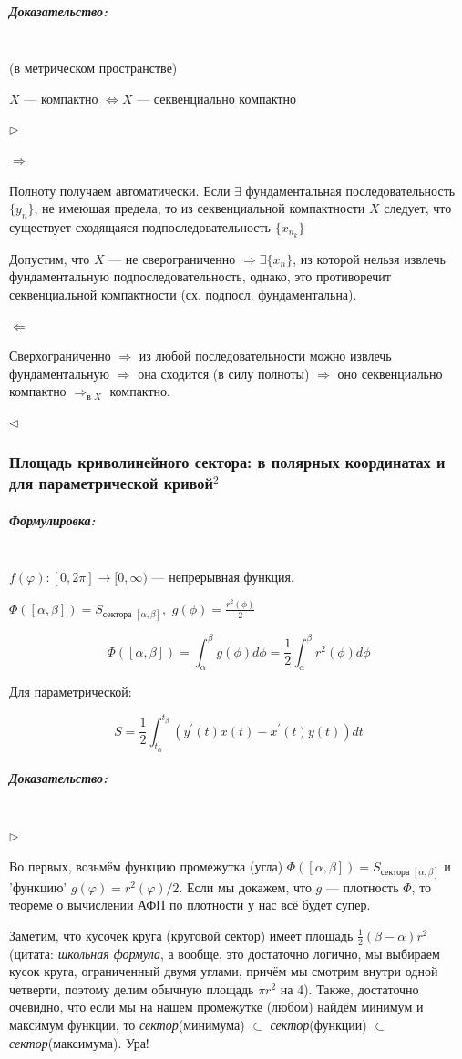 \documentclass{article}
\def\dbl{\,\,}
\let\vanillasubparagraph\subparagraph
\renewcommand{\subparagraph}[1]{\vanillasubparagraph{#1}\mbox{}\\}
\begin{document}
\subparagraph{Доказательство: }
(в метрическом пространстве)

$X$ --- компактно $\Leftrightarrow X$ --- секвенциально компактно

$\rhd$

$\Rightarrow$

Полноту получаем автоматически. Если $\exists$ фундаментальная последовательность $\{y_n\}$, не имеющая предела, то из секвенциальной компактности $X$ следует, что существует сходящаяся подпоследовательность $\{x_{n_k}\}$

Допустим, что $X$ --- не сверограниченно $\Rightarrow \exists \{x_n\}$, из которой нельзя извлечь фундаментальную подпоследовательность, однако, это противоречит секвенциальной компактности (сх. подпосл. фундаментальна).

$\Leftarrow$

Сверхограниченно $\Rightarrow$ из любой последовательности можно извлечь фундаментальную $\Rightarrow$ она сходится (в силу полноты) $\Rightarrow$ оно секвенциально компактно $\Rightarrow_{\text{в } X}$ компактно.

$\lhd$

\subsubsection{Площадь криволинейного сектора: в полярных координатах и для параметрической кривой\texorpdfstring{$^2$}{}}

\subparagraph{Формулировка:}

$f(\varphi): [0, 2\pi] \rightarrow [0, \infty)$ --- непрерывная функция.

$\Phi([\alpha, \beta]) = S_{\text{сектора } [\alpha, \beta]}, \dbl g(\phi) = \frac{r^2(\phi)}{2}$

\[\Phi([\alpha, \beta]) = \int_\alpha^\beta{g(\phi)d\phi} = \frac{1}{2}\int_\alpha^\beta{r^2(\phi)d\phi}\]

Для параметрической:

\[S =  \frac{1}{2}\int_{t_\alpha}^{t_\beta}{(y^\prime(t)x(t) - x^\prime(t)y(t))dt}\]

\subparagraph{Доказательство:}

$\rhd$

Во первых, возьмём функцию промежутка (угла) $\Phi([\alpha, \beta]) = S_{\text{сектора }[\alpha, \beta]}$ и 'функцию' $g(\varphi) = r^2(\varphi)/2$. Если мы докажем, что $g$ --- плотность $\Phi$, то теореме о вычислении АФП по плотности у нас всё будет супер.

Заметим, что кусочек круга (круговой сектор) имеет площадь $\frac{1}{2}(\beta - \alpha) r^2$ (цитата: \textit{школьная формула}, а вообще, это достаточно логично, мы выбираем кусок круга, ограниченный двумя углами, причём мы смотрим внутри одной четверти, поэтому делим обычную площадь $\pi r^2$ на 4). Также, достаточно очевидно, что если мы на нашем промежутке (любом) найдём минимум и максимум функции, то \textit{сектор}(минимума) $\subset$ \textit{сектор}(функции) $\subset$ \textit{сектор}(максимума). Ура! 
\end{document}
